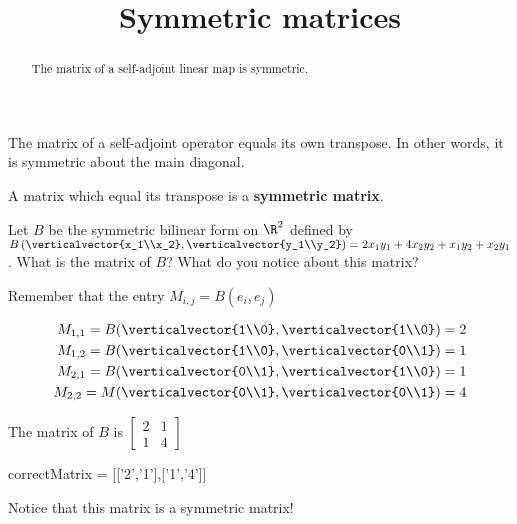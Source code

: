 \documentclass{ximera}
\title{Symmetric matrices}
\begin{document}
\begin{abstract}
  The matrix of a self-adjoint linear map is symmetric.
\end{abstract}\maketitle

The matrix of a self-adjoint operator equals its own transpose.  In other words, it is symmetric about the main diagonal.  
\begin{definition}
  A matrix which equal its transpose is a \textbf{symmetric matrix}.
\end{definition}

\begin{question}
  Let $B$ be the symmetric bilinear form on $\R^2$ defined by 
  $B\left(\verticalvector{x_1\\x_2},\verticalvector{y_1\\y_2}\right) = 2x_1y_1+4x_2y_2+x_1y_2+x_2y_1$.  
  What is the matrix of $B$?  What do you notice about this matrix?
  \begin{solution}
    \begin{hint}
      Remember that the entry $M_{i,j} = B(e_i,e_j)$
    \end{hint}
    \begin{hint}
      \begin{align*}
        M_{1,1} = B(\verticalvector{1\\0},\verticalvector{1\\0}) = 2\\
        M_{1,2} = B(\verticalvector{1\\0},\verticalvector{0\\1}) = 1\\
        M_{2,1} = B(\verticalvector{0\\1},\verticalvector{1\\0}) = 1\\
        M_{2,2} = M(\verticalvector{0\\1},\verticalvector{0\\1}) = 4
      \end{align*}
    \end{hint}
    \begin{hint}
      The matrix of $B$ is \(\begin{bmatrix} 2 & 1 \\ 1 & 4\end{bmatrix}\)
    \end{hint}
    \begin{matrix-answer}
      correctMatrix = [['2','1'],['1','4']]
    \end{matrix-answer}
  \end{solution}
  Notice that this matrix is a symmetric matrix!
\end{question}
\end{document}
